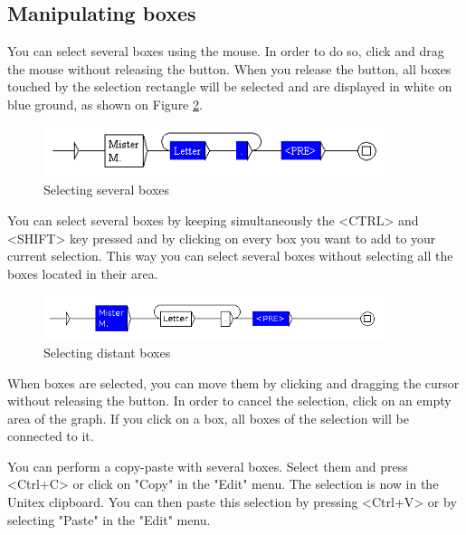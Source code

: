 \subsection{Manipulating boxes}

You can select several boxes using the mouse. In order to do so, click and drag the
mouse without releasing the button. When you release the button, all boxes
touched by the selection rectangle will be selected and are displayed in
white on blue ground, as shown on Figure \ref{multi-selection}.

\begin{figure}[!ht]
\begin{center}
\includegraphics[width=10cm]{resources/img/fig5-13.png}
\caption{Selecting several boxes\label{multi-selection}}
\end{center}
\end{figure}
\noindent You can select several boxes by keeping simultaneously the <CTRL> and <SHIFT> key pressed and by clicking on every box you want to add to your current selection. This way you can select several boxes without selecting all the boxes located in their area.

\begin{figure}[!ht]
\begin{center}
\includegraphics[width=10cm]{resources/img/fig5-13b.png}
\caption{Selecting distant boxes\label{multi-selection}}
\end{center}
\end{figure}
\bigskip
\noindent When boxes are selected, you can move them by clicking and
dragging the cursor without releasing the button. In order to cancel the selection, click on
an empty area of the graph. If you click on a box, all boxes of the selection
will be connected to it.

\bigskip
{}
\noindent You can perform a copy-paste with several boxes. Select them and
press <Ctrl+C> or click on "Copy" in the "Edit" menu. The selection is now in the Unitex
clipboard. You can then paste this selection by pressing <Ctrl+V> or by selecting
"Paste" in the "Edit" menu.

